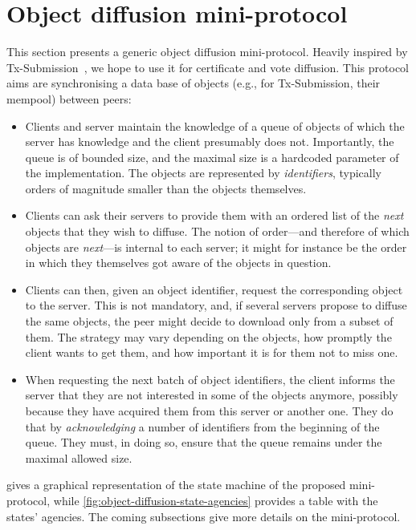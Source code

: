 \section{Object diffusion mini-protocol}%
\label{sec:object-diffusion-protocol}

This section presents a generic object diffusion mini-protocol. Heavily inspired
by Tx-Submission~\cite[Section~3.9]{network-spec-150}, we hope to use it for
certificate and vote diffusion. This protocol aims are synchronising a data base
of objects (e.g., for Tx-Submission, their mempool) between peers:
%
\begin{itemize}
\item
  Clients and server maintain the knowledge of a queue of objects of which the server has knowledge and the client presumably does not.
  Importantly, the queue is of bounded size, and the maximal size is a hardcoded parameter of the
  implementation.
  The objects are represented by {\em identifiers}, typically orders of magnitude smaller than the objects themselves.

\item
  Clients can ask their servers to provide them with an ordered list of the {\em next} objects that they wish to diffuse.
  The notion of order---and therefore of which objects are {\em next}---is internal to each server; it might for instance be the order in which they themselves got aware of the objects in question.

\item
  Clients can then, given an object identifier, request the corresponding object to the server.
  This is not mandatory, and, if several servers propose to diffuse the same objects, the peer might decide to download only from a subset of them.
  The strategy may vary depending on the objects, how promptly the client wants to get them, and how important it is for them not to miss one.

\item
  When requesting the next batch of object identifiers, the client informs the server that they are not interested in some of the objects anymore, possibly because they have acquired them from this server or another one.
  They do that by {\em acknowledging} a number of identifiers from the beginning of the queue.
  They must, in doing so, ensure that the queue remains under the maximal allowed size.
\end{itemize}

 gives a graphical representation of the state machine of the proposed mini-protocol, while \cref{fig:object-diffusion-state-agencies} provides a table with the states' agencies.
The coming subsections give more details on the mini-protocol.


